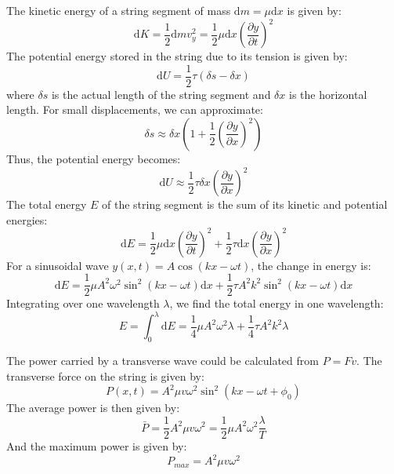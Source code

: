 \documentclass[11pt]{report}
\begin{document}
\begin{definition}
    The kinetic energy of a string segment of mass \( \text{d}m = \mu \text{d}x \) is given by:
    \begin{equation}
        \text{d}K = \frac{1}{2} \text{d}m v_y^2 = \frac{1}{2} \mu \text{d}x \left(\frac{\partial y}{\partial t}\right)^2
    \end{equation}
    The potential energy stored in the string due to its tension is given by:
    \begin{equation}
        \text{d}U = \frac{1}{2} \tau (\delta s - \delta x) 
    \end{equation}
    where \( \delta s \) is the actual length of the string segment and \( \delta x \) is the horizontal length. For small displacements, we can approximate:
    $$
        \delta s \approx \delta x \left(1 + \frac{1}{2}\left(\frac{\partial y}{\partial x}\right)^2\right)
    $$
    Thus, the potential energy becomes:
    \begin{equation}
        \text{d}U \approx \frac{1}{2} \tau \delta x \left(\frac{\partial y}{\partial x}\right)^2
    \end{equation}
    The total energy \( E \) of the string segment is the sum of its kinetic and potential energies:
    \begin{equation}
        \text{d}E = \frac{1}{2} \mu \text{d}x \left(\frac{\partial y}{\partial t}\right)^2 + \frac{1}{2} \tau \text{d}x \left(\frac{\partial y}{\partial x}\right)^2
    \end{equation}
    For a sinusoidal wave \( y(x,t) = A \cos(kx - \omega t) \), the change in energy is:
    \begin{equation}
        \text{d}E = \frac{1}{2} \mu A^2 \omega^2 \sin^2(kx - \omega t) \text{d}x + \frac{1}{2} \tau A^2 k^2 \sin^2(kx - \omega t) \text{d}x
    \end{equation}
    Integrating over one wavelength \( \lambda \), we find the total energy in one wavelength:
    \begin{equation}
        E = \int_0^\lambda \text{d}E = \frac{1}{4} \mu A^2 \omega^2 \lambda + \frac{1}{4} \tau A^2 k^2 \lambda
    \end{equation}
    
\end{definition}

\begin{definition}
   The power carried by a transverse wave could be calculated from $P=Fv$. The transverse force on the string is given by:
    \begin{equation}
        P(x,t) = A^2 \mu v \omega^2 \sin^2(kx - \omega t + \phi_0)
    \end{equation}
    The average power is then given by:
    \begin{equation}
        \bar{P} = \frac{1}{2} A^2 \mu v \omega^2 = \frac{1}{2} \mu A^2 \omega^2 \frac{\lambda}{T}
    \end{equation}
    And the maximum power is given by:
    \begin{equation}
        P_{max} = A^2 \mu v \omega^2
    \end{equation}
\end{definition}
\end{document}
